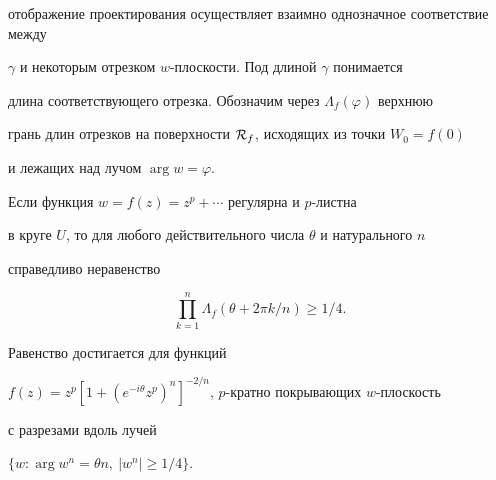 отображение проектирования осуществляет взаимно однозначное соответствие между


$\gamma$ и некоторым отрезком $w$-плоскости. Под длиной $\gamma$ понимается


длина соответствующего отрезка. Обозначим через $\Lambda_f(\varphi)$ верхнюю


грань длин отрезков на поверхности ${\cal R}_f$, исходящих из точки $W_0=f(0)$


и лежащих над лучом $\arg w =\varphi$.





\begin{thm}


Если функция $w=f(z)=z^p+\dotsb$ регулярна и $p$-листна


в круге $U$, то для любого действительного числа $\theta$ и натурального $n$


справедливо неравенство


$$


\prod \limits_{k=1}^{n}\Lambda_f(\theta+2\pi k/n)\geq 1/4.


$$


Равенство достигается для функций


$f(z)=z^p[1+(e^{-i\theta}z^p)^n]^{-2/n}$, $p$-кратно покрывающих $w$-плоскость


с разрезами вдоль лучей


$\{w:\arg w^n = \theta n,\ |w^n| \geq 1/4 \}$.


\end{thm}





